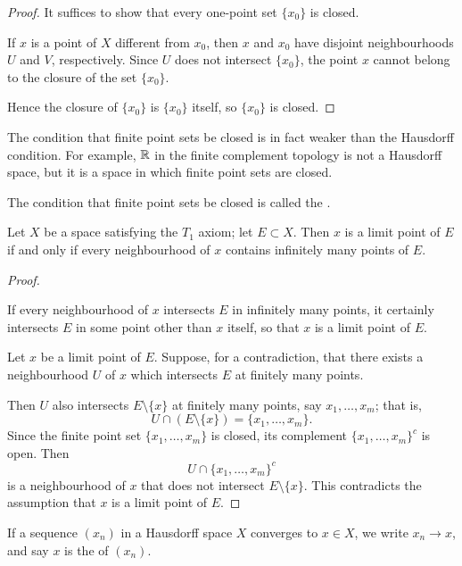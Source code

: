 \begin{proof}
It suffices to show that every one-point set $\{x_0\}$ is closed. 

If $x$ is a point of $X$ different from $x_0$, then $x$ and $x_0$ have disjoint neighbourhoods $U$ and $V$, respectively.
Since $U$ does not intersect $\{x_0\}$, the point $x$ cannot belong to the closure of the set $\{x_0\}$.

Hence the closure of $\{x_0\}$ is $\{x_0\}$ itself, so $\{x_0\}$ is closed.
\end{proof}

The condition that finite point sets be closed is in fact weaker than the Hausdorff condition. For example, $\mathbb R$ in the finite complement topology is not a Hausdorff space, but it is a space in which finite point sets are closed. 

The condition that finite point sets be closed is called the .

\begin{proposition}
Let $X$ be a space satisfying the $T_1$ axiom; let $E\subset X$. Then $x$ is a limit point of $E$ if and only if every neighbourhood of $x$ contains infinitely many points of $E$.
\end{proposition}

\begin{proof} \

\backward If every neighbourhood of $x$ intersects $E$ in infinitely many points, it certainly intersects $E$ in some point other than $x$ itself, so that $x$ is a limit point of $E$.

\forward Let $x$ be a limit point of $E$. Suppose, for a contradiction, that there exists a neighbourhood $U$ of $x$ which intersects $E$ at finitely many points.

Then $U$ also intersects $E\setminus\{x\}$ at finitely many points, say $x_1,\dots,x_m$; that is,
\[U\cap(E\setminus\{x\})=\{x_1,\dots,x_m\}.\]
Since the finite point set $\{x_1,\dots,x_m\}$ is closed, its complement $\{x_1,\dots,x_m\}^c$ is open. Then
\[U\cap\{x_1,\dots,x_m\}^c\]
is a neighbourhood of $x$ that does not intersect $E\setminus\{x\}$. This contradicts the assumption that $x$ is a limit point of $E$.
\end{proof}

\begin{definition}[Limit]
If a sequence $(x_n)$ in a Hausdorff space $X$ converges to $x\in X$, we write $x_n\to x$, and say $x$ is the  of $(x_n)$.
\end{definition}


